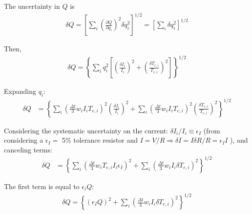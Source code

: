 \documentclass[11pt,twoside]{article}
\begin{document}
The uncertainty in $Q$ is
\begin{align*}
\delta Q = \left[\sum_i \left(\frac{\partial Q}{\partial q_i}\right)^2 \delta q_i^2\right]^{1/2} = \left[\sum_i  \delta q_i^2\right]^{1/2}
\end{align*}

Then,
\begin{align*}
\delta Q = \left\{\sum_i q_i^2 \left[  \left( \frac{\delta I_i}{I_i}\right)^2 + \left( \frac{\delta T_{e,i}}{T_{e,i}}\right)^2\right]\right\}^{1/2}
\end{align*}

Expanding $q_i$:
\begin{align*}
\delta Q &=
\left\{
  \sum_i \left( \frac{\Delta t}{3} w_i I_i T_{e,i} \right)^2  \left( \frac{\delta I_i}{I_i}\right)^2
  + \sum_i \left( \frac{\Delta t}{3} w_i I_i T_{e,i} \right)^2 \left( \frac{\delta T_{e,i}}{T_{e,i}}\right)^2
\right\}^{1/2}
\end{align*}

Considering the systematic uncertainty on the current: $\delta I_i / I_i \equiv \epsilon_I$ (from considering a $\epsilon_I = $ 5\% tolerance resistor and $I = V/R \Rightarrow \delta I = I \delta R / R = \epsilon_I I$ ), and canceling terms:
\begin{align*}
\delta Q &=
\left\{
  \sum_i \left( \frac{\Delta t}{3} w_i T_{e,i} I_i \epsilon_I \right)^2  
  + \sum_i \left( \frac{\Delta t}{3} w_i I_i  \delta T_{e,i} \right)^2
\right\}^{1/2}
\end{align*}

The first term is equal to $\epsilon_i Q$:
\begin{align}
\boxed{
\delta Q =
\left\{
  \left(\epsilon_I Q\right)^2
  + \sum_i \left( \frac{\Delta t}{3} w_i I_i  \delta T_{e,i} \right)^2 \label{eq:uncertainty-Q}
\right\}^{1/2}
}
\end{align}
\end{document}

